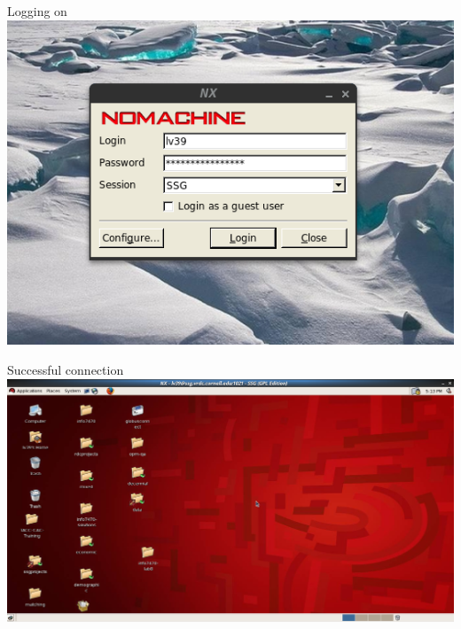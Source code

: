 \documentclass[xcolor=table,compress]{beamer}
\begin{document}
\begin{frame}{Logging on}
\centering
\includegraphics[height=.7\textheight]{nx-login-box.png}
\end{frame}


\begin{frame}{Successful connection}
\centering
\includegraphics[width=1\textheight]{nx-logged-on.png}
\end{frame}


%
%
%
\end{document}
